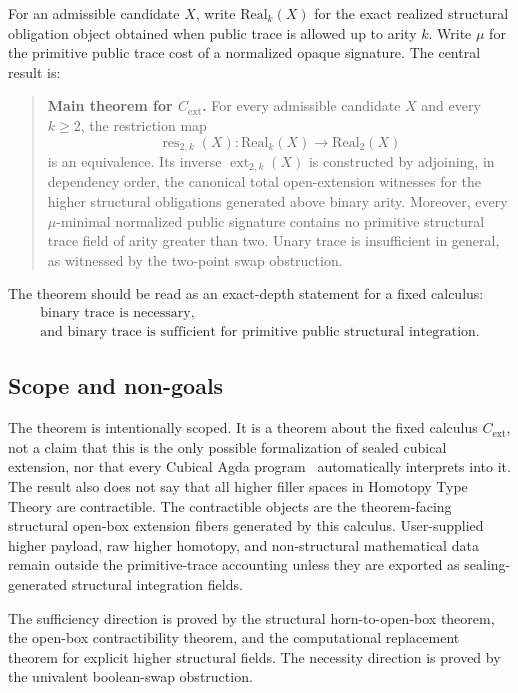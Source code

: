 \documentclass{lmcs}
\newcommand{\res}{\operatorname{res}}
\newcommand{\ext}{\operatorname{ext}}
\begin{document}
For an admissible candidate \(X\), write \(\mathrm{Real}_k(X)\) for the exact
realized structural obligation object obtained when public trace is allowed up
to arity \(k\).  Write \(\mu\) for the primitive public trace cost of a normalized
opaque signature.  The central result is:
\begin{quote}
\textbf{Main theorem for \(C_{\mathrm{ext}}\).}
For every admissible candidate \(X\) and every \(k\geq 2\), the restriction map
\[
  \res_{2,k}(X):\mathrm{Real}_k(X)\longrightarrow\mathrm{Real}_2(X)
\]
is an equivalence.  Its inverse \(\ext_{2,k}(X)\) is constructed by adjoining,
in dependency order, the canonical total open-extension witnesses for the
higher structural obligations generated above binary arity.
Moreover, every \(\mu\)-minimal normalized public signature contains no primitive
structural trace field of arity greater than two.  Unary trace is insufficient in
general, as witnessed by the two-point swap obstruction.
\end{quote}

The theorem should be read as an exact-depth statement for a fixed calculus:
\[
  \begin{gathered}
  \text{binary trace is necessary,}\\
  \text{and binary trace is sufficient for primitive public structural integration.}
  \end{gathered}
\]

\subsection{Scope and non-goals}
\label{subsec:scope-nongoals}

The theorem is intentionally scoped.  It is a theorem about the fixed calculus
\(C_{\mathrm{ext}}\), not a claim that this is the only possible formalization
of sealed cubical extension, nor that every Cubical Agda program~\cite{cubical-agda}
automatically interprets into it.  The result also does not say that all higher
filler spaces in Homotopy Type Theory are contractible.  The contractible
objects are the theorem-facing structural open-box extension fibers generated by
this calculus.  User-supplied higher payload, raw higher homotopy, and
non-structural mathematical data remain outside the primitive-trace accounting
unless they are exported as sealing-generated structural integration fields.

The sufficiency direction is proved by the structural horn-to-open-box theorem,
the open-box contractibility theorem, and the computational replacement theorem
for explicit higher structural fields.  The necessity direction is proved by the
univalent boolean-swap obstruction.
\end{document}
